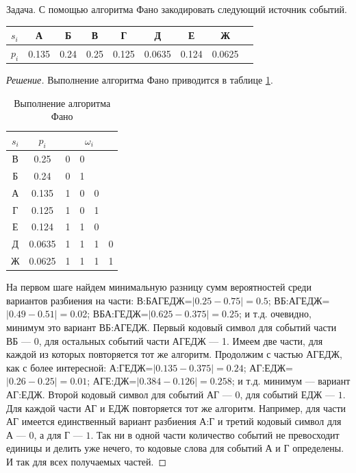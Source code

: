 \begin{exampl} Задача. С помощью алгоритма Фано закодировать следующий источник событий.

    \begin{tabular}{|l||c|c|c|c|c|c|c|c|}
        \hline
        $s_i$   &А      &Б      &В      &Г      &Д      &Е      &Ж      \\ \hline
        $p_i$   &0.135  &0.24   &0.25   &0.125  &0.0635 &0.124  &0.0625 \\ \hline
    \end{tabular}
\end{exampl}
\begin{proof}[Решение]
    Выполнение алгоритма Фано приводится в таблице \ref{table:code:fano}.
    \begin{table}
        \centering
        \begin{tabular}{|c|c||c|c|c|c|}
            \hline\hline
            $s_i$   &$p_i$  &\multicolumn{4}{c|}{$\omega_i$}\\ \hline\hline
            В       &0.25   &0&0&\multicolumn{2}{c|}{}      \\ \cline{4-4}
            Б       &0.24   &0&1&\multicolumn{2}{c|}{}      \\ \cline{3-5}
            А       &0.135  &1&0&0&                         \\ \cline{5-5}
            Г       &0.125  &1&0&1&                         \\ \cline{4-5}
            Е       &0.124  &1&1&0&                         \\ \cline{5-6}
            Д       &0.0635 &1&1&1&0                        \\ \cline{6-6}
            Ж       &0.0625 &1&1&1&1                        \\ \hline            
        \end{tabular}
        \caption{Выполнение алгоритма Фано}
        \label{table:code:fano}
    \end{table}
    
    На первом шаге найдем минимальную разницу сумм вероятностей среди вариантов разбиения на части: В:БАГЕДЖ=$|0.25-0.75|=0.5$; ВБ:АГЕДЖ=$|0.49-0.51|=0$.02; ВБА:ГЕДЖ=$|0.625-0.375|=0.25$; и т.д. очевидно, минимум это вариант ВБ:АГЕДЖ. Первый кодовый символ для событий части ВБ --- 0, для остальных событий части АГЕДЖ  --- 1. Имеем две части, для каждой из которых повторяется тот же алгоритм. Продолжим с частью АГЕДЖ, как с более интересной: А:ГЕДЖ=$|0.135-0.375|=0.24$; АГ:ЕДЖ=$|0.26-0.25|=0.01$; АГЕ:ДЖ=$|0.384-0.126|=0.258$; и т.д. минимум --- вариант АГ:ЕДЖ. Второй кодовый символ для событий АГ --- $0$, для событий ЕДЖ --- $1$. Для каждой части АГ и ЕДЖ повторяется тот же алгоритм. Например, для части АГ имеется единственный вариант разбиения А:Г и третий кодовый символ для А --- $0$, а для Г --- $1$. Так ни в одной части количество событий не превосходит единицы и делить уже нечего, то кодовые слова для событий А и Г определены. И так для всех получаемых частей.
\end{proof}


